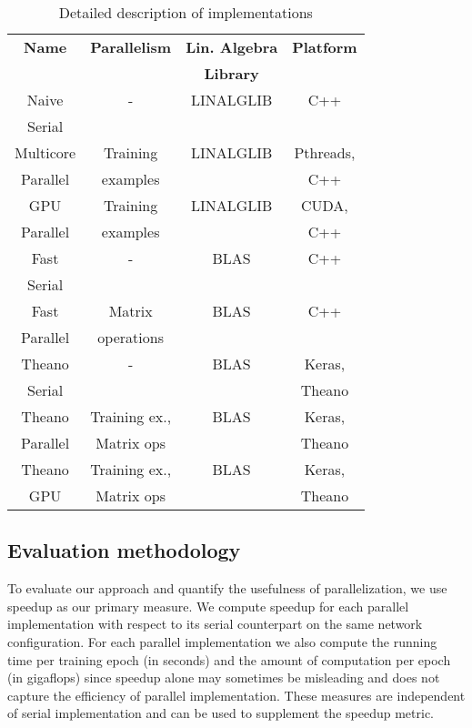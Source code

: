 \begin{table}[h]
\centering
\begin{tabular}{|c|c|c|c|}
\hline
\textbf{Name} & \textbf{Parallelism} & \textbf{Lin. Algebra} & \textbf{Platform} \\
 & & \textbf{Library} & \\
\hline
Naive & - & LINALGLIB & C++ \\
Serial & & & \\
\hline
Multicore & Training & LINALGLIB & Pthreads, \\
Parallel & examples & & C++ \\
\hline
GPU & Training & LINALGLIB & CUDA, \\
Parallel & examples & & C++ \\
\hline
Fast & - & BLAS & C++ \\
Serial & & & \\
\hline
Fast & Matrix & BLAS & C++ \\
Parallel & operations & & \\
\hline
Theano & - & BLAS & Keras, \\
Serial & & & Theano \\
\hline
Theano & Training ex., & BLAS & Keras, \\
Parallel & Matrix ops & & Theano\\
\hline
Theano & Training ex., & BLAS & Keras, \\
GPU & Matrix ops & & Theano \\
\hline
\end{tabular}
\caption{Detailed description of implementations}
\label{tab:exp}
\end{table}

\subsection{Evaluation methodology}
\label{sub:eval}

To evaluate our approach and quantify the usefulness of parallelization, we use speedup as our primary measure.
We compute speedup for each parallel implementation with respect to its serial counterpart on the same network configuration.
For each parallel implementation we also compute the running time per training epoch (in seconds) and the amount of computation per epoch (in gigaflops) since speedup alone may sometimes be misleading and does not capture the efficiency of parallel implementation. These measures are independent of serial implementation and can be used to supplement the speedup metric.